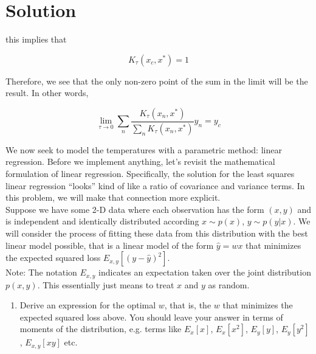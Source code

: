 \documentclass[submit]{../harvardml}
\newenvironment{solution}
  {\color{blue}\section*{Solution}}
{}
\begin{document}
\begin{solution}
\begin{enumerate}
\begin{enumerate}
            this implies that

            \[
            K_\tau (x_c,x^*) = 1
            \]

            Therefore, we see that the only non-zero point of the sum in the limit will be the result. In other words,

            \[
            \lim_{\tau \to 0}\sum_{n} \frac{K_\tau (x_n,x^*)}{\sum_{n}K_\tau (x_n,x^*)}y_n = y_c
            \]
            
        \end{enumerate}
	\end{enumerate}
\end{solution}


\newpage
\begin{problem}

We now seek to model the temperatures with a parametric method: linear regression. Before we implement anything, let's revisit the mathematical formulation of linear regression.  Specifically, the solution for the least squares linear regression  ``looks'' kind of like a ratio of covariance and
variance terms.  In this problem, we will make that connection more
explicit. \\

\noindent Suppose we have some 2-D data where each observation has the form $(x, y)$ and is independent and identically distributed according  $x \sim p(x)$, $y \sim p(y|x)$. We will consider the process of fitting these data from this distribution with the best linear model
possible, that is a linear model of the form $\hat{y} = wx$ that
minimizes the expected squared loss $E_{x,y}[ ( y - \hat{y} )^2
    ]$.\\

\noindent Note: The notation $E_{x, y}$ indicates an
expectation taken over the joint distribution $p(x,y)$. This essentially just means to treat $x$ and $y$ as random.  

\begin{enumerate}

  \item Derive an expression for the optimal $w$, that is, the $w$
        that minimizes the expected squared loss above.  You should leave
        your answer in terms of moments of the distribution, e.g. terms
        like $E_x[x]$, $E_x[x^2]$, $E_y[y]$, $E_y[y^2]$, $E_{x,y}[xy]$
        etc.


\end{enumerate}
\end{problem}
\end{document}
